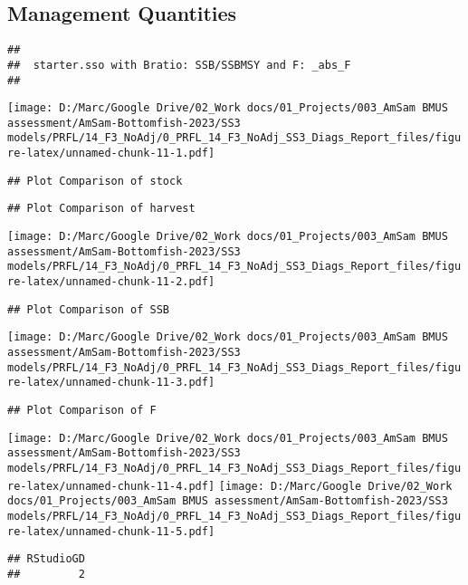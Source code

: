 \documentclass[
]{article}
\begin{document}
\hypertarget{management-quantities}{%
\subsection{Management Quantities}\label{management-quantities}}

\begin{verbatim}
## 
##  starter.sso with Bratio: SSB/SSBMSY and F: _abs_F 
## 
\end{verbatim}

\texttt{[image: D:/Marc/Google Drive/02\_Work docs/01\_Projects/003\_AmSam BMUS assessment/AmSam-Bottomfish-2023/SS3 models/PRFL/14\_F3\_NoAdj/0\_PRFL\_14\_F3\_NoAdj\_SS3\_Diags\_Report\_files/figure-latex/unnamed-chunk-11-1.pdf]}

\begin{verbatim}
## Plot Comparison of stock
\end{verbatim}

\begin{verbatim}
## Plot Comparison of harvest
\end{verbatim}

\texttt{[image: D:/Marc/Google Drive/02\_Work docs/01\_Projects/003\_AmSam BMUS assessment/AmSam-Bottomfish-2023/SS3 models/PRFL/14\_F3\_NoAdj/0\_PRFL\_14\_F3\_NoAdj\_SS3\_Diags\_Report\_files/figure-latex/unnamed-chunk-11-2.pdf]}

\begin{verbatim}
## Plot Comparison of SSB
\end{verbatim}

\texttt{[image: D:/Marc/Google Drive/02\_Work docs/01\_Projects/003\_AmSam BMUS assessment/AmSam-Bottomfish-2023/SS3 models/PRFL/14\_F3\_NoAdj/0\_PRFL\_14\_F3\_NoAdj\_SS3\_Diags\_Report\_files/figure-latex/unnamed-chunk-11-3.pdf]}

\begin{verbatim}
## Plot Comparison of F
\end{verbatim}

\texttt{[image: D:/Marc/Google Drive/02\_Work docs/01\_Projects/003\_AmSam BMUS assessment/AmSam-Bottomfish-2023/SS3 models/PRFL/14\_F3\_NoAdj/0\_PRFL\_14\_F3\_NoAdj\_SS3\_Diags\_Report\_files/figure-latex/unnamed-chunk-11-4.pdf]}
\texttt{[image: D:/Marc/Google Drive/02\_Work docs/01\_Projects/003\_AmSam BMUS assessment/AmSam-Bottomfish-2023/SS3 models/PRFL/14\_F3\_NoAdj/0\_PRFL\_14\_F3\_NoAdj\_SS3\_Diags\_Report\_files/figure-latex/unnamed-chunk-11-5.pdf]}

\begin{verbatim}
## RStudioGD 
##         2
\end{verbatim}
\end{document}
